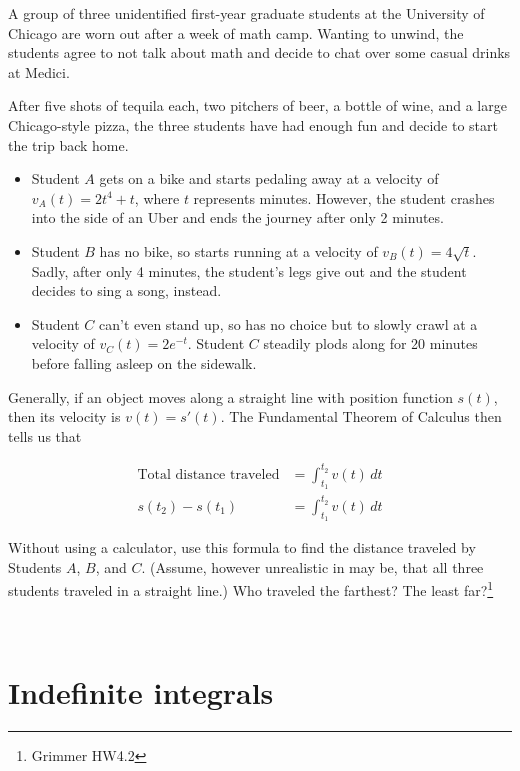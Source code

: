 \documentclass[
]{article}
\providecommand{\tightlist}{%
  \setlength{\itemsep}{0pt}\setlength{\parskip}{0pt}}
\begin{document}
A group of three unidentified first-year graduate students at the
University of Chicago are worn out after a week of math camp. Wanting to
unwind, the students agree to not talk about math and decide to chat
over some casual drinks at Medici.

After five shots of tequila each, two pitchers of beer, a bottle of
wine, and a large Chicago-style pizza, the three students have had
enough fun and decide to start the trip back home.

\begin{itemize}
\tightlist
\item
  Student \(A\) gets on a bike and starts pedaling away at a velocity of
  \(v_A(t) = 2t^4 + t\), where \(t\) represents minutes. However, the
  student crashes into the side of an Uber and ends the journey after
  only 2 minutes.
\item
  Student \(B\) has no bike, so starts running at a velocity of
  \(v_B(t) = 4\sqrt{t}\). Sadly, after only 4 minutes, the student's
  legs give out and the student decides to sing a song, instead.
\item
  Student \(C\) can't even stand up, so has no choice but to slowly
  crawl at a velocity of \(v_C(t) = 2e^{-t}\). Student \(C\) steadily
  plods along for 20 minutes before falling asleep on the sidewalk.
\end{itemize}

Generally, if an object moves along a straight line with position
function \(s(t)\), then its velocity is \(v(t) = s'(t)\). The
Fundamental Theorem of Calculus then tells us that

\[
\begin{aligned}
\textrm{Total distance traveled} &= \int_{t_1}^{t_2} v(t) \,dt\\
s(t_2) - s(t_1) &= \int_{t_1}^{t_2} v(t) \,dt
\end{aligned}
\]

Without using a calculator, use this formula to find the distance
traveled by Students \(A\), \(B\), and \(C\). (Assume, however
unrealistic in may be, that all three students traveled in a straight
line.) Who traveled the farthest? The least far?\footnote{Grimmer HW4.2}

~\\
\newpage

\section{Indefinite integrals}\label{indefinite-integrals}
\end{document}
